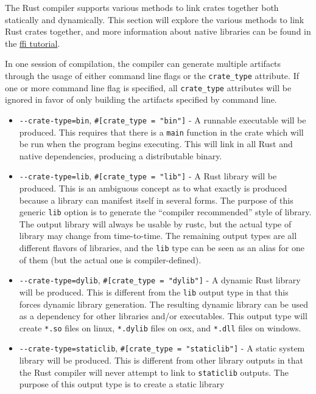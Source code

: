\documentclass[]{article}
\begin{document}
The Rust compiler supports various methods to link crates together both
statically and dynamically. This section will explore the various
methods to link Rust crates together, and more information about native
libraries can be found in the \href{guide-ffi.html}{ffi tutorial}.

In one session of compilation, the compiler can generate multiple
artifacts through the usage of either command line flags or the
\texttt{crate\_type} attribute. If one or more command line flag is
specified, all \texttt{crate\_type} attributes will be ignored in favor
of only building the artifacts specified by command line.

\begin{itemize}
\item
  \texttt{-\/-crate-type=bin}, \texttt{\#{[}crate\_type = "bin"{]}} - A
  runnable executable will be produced. This requires that there is a
  \texttt{main} function in the crate which will be run when the program
  begins executing. This will link in all Rust and native dependencies,
  producing a distributable binary.
\item
  \texttt{-\/-crate-type=lib}, \texttt{\#{[}crate\_type = "lib"{]}} - A
  Rust library will be produced. This is an ambiguous concept as to what
  exactly is produced because a library can manifest itself in several
  forms. The purpose of this generic \texttt{lib} option is to generate
  the ``compiler recommended'' style of library. The output library will
  always be usable by rustc, but the actual type of library may change
  from time-to-time. The remaining output types are all different
  flavors of libraries, and the \texttt{lib} type can be seen as an
  alias for one of them (but the actual one is compiler-defined).
\item
  \texttt{-\/-crate-type=dylib}, \texttt{\#{[}crate\_type = "dylib"{]}}
  - A dynamic Rust library will be produced. This is different from the
  \texttt{lib} output type in that this forces dynamic library
  generation. The resulting dynamic library can be used as a dependency
  for other libraries and/or executables. This output type will create
  \texttt{*.so} files on linux, \texttt{*.dylib} files on osx, and
  \texttt{*.dll} files on windows.
\item
  \texttt{-\/-crate-type=staticlib},
  \texttt{\#{[}crate\_type = "staticlib"{]}} - A static system library
  will be produced. This is different from other library outputs in that
  the Rust compiler will never attempt to link to \texttt{staticlib}
  outputs. The purpose of this output type is to create a static library

\end{itemize}
\end{document}
